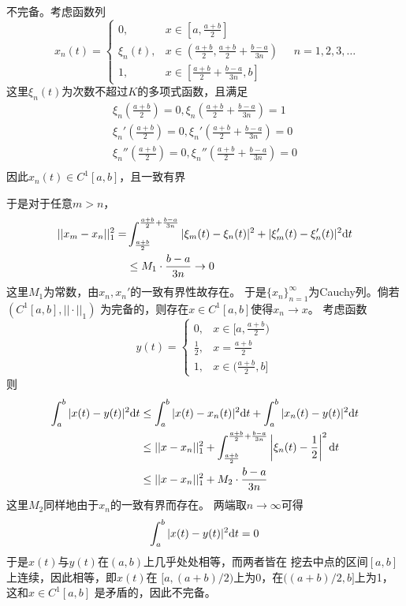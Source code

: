 \documentclass[cn]{homework}
\begin{document}
\begin{subproblem}
        \item
        不完备。考虑函数列
        \[x_n(t)=\begin{cases}
            0,&x\in[a,\frac{a+b}{2}]\\
            \xi_n(t),&x\in(\frac{a+b}{2},\frac{a+b}{2}+\frac{b-a}{3n})\\
            1,&x\in[\frac{a+b}{2}+\frac{b-a}{3n},b]
        \end{cases}
        \quad n=1,2,3,\ldots\]
        这里$\xi_n(t)$为次数不超过$K$的多项式函数，且满足
        \[\begin{aligned}
            \xi_n\left(\frac{a+b}{2}\right)=0,
            \xi_n\left(\frac{a+b}{2}+\frac{b-a}{3n}\right)=1\\
            \xi_n'\left(\frac{a+b}{2}\right)=0,
            \xi_n'\left(\frac{a+b}{2}+\frac{b-a}{3n}\right)=0\\
            \xi_n''\left(\frac{a+b}{2}\right)=0,
            \xi_n''\left(\frac{a+b}{2}+\frac{b-a}{3n}\right)=0\\
        \end{aligned}\]
        因此$x_n(t)\in C^1[a,b]$，且一致有界

        于是对于任意$m>n$，
        \[\begin{aligned}
            ||x_m-x_n||_1^2=&\int_{\frac{a+b}{2}}^{\frac{a+b}{2}+\frac{b-a}{3n}}
            |\xi_m(t)-\xi_n(t)|^2+|\xi'_m(t)-\xi'_n(t)|^2\mathrm d t\\
            &\leq M_1\cdot\frac{b-a}{3n}\to 0
        \end{aligned}\]
        这里$M_1$为常数，由$x_n,x_n'$的一致有界性故存在。
        于是$\{x_n\}_{n=1}^\infty$为Cauchy列。倘若$(C^1[a,b],||\cdot||_1)$
        为完备的，则存在$x\in C^1[a,b]$使得$x_n\to x$。
        考虑函数
        \[y(t)=\begin{cases}
            0,&x\in[a,\frac{a+b}{2})\\
            \frac{1}{2},&x=\frac{a+b}{2}\\
            1,&x\in(\frac{a+b}{2},b]
        \end{cases}\]
        则
        \[\begin{aligned}
        \int_a^b|x(t)-y(t)|^2\mathrm d t
        &\leq\int_a^b|x(t)-x_n(t)|^2\mathrm d t
        +\int_a^b|x_n(t)-y(t)|^2\mathrm d t\\
        &\leq ||x-x_n||_1^2
            +\int_{\frac{a+b}{2}}^{\frac{a+b}{2}+\frac{b-a}{3n}}
                \left|\xi_n(t)-\frac{1}{2}\right|^2\mathrm d t\\
        &\leq ||x-x_n||^2_1+M_2\cdot\frac{b-a}{3n}
        \end{aligned}\]
        这里$M_2$同样地由于$x_n$的一致有界而存在。
        两端取$n\to\infty$可得
        \[\int_a^b|x(t)-y(t)|^2\mathrm d t=0\]
        于是$x(t)$与$y(t)$在$(a,b)$上几乎处处相等，而两者皆在
        挖去中点的区间$[a,b]$上连续，因此相等，即$x(t)$在
        $[a,(a+b)/2)$上为0，在$((a+b)/2,b]$上为1，这和$x\in C^1[a,b]$
        是矛盾的，因此不完备。
    \end{subproblem}
\end{document}
